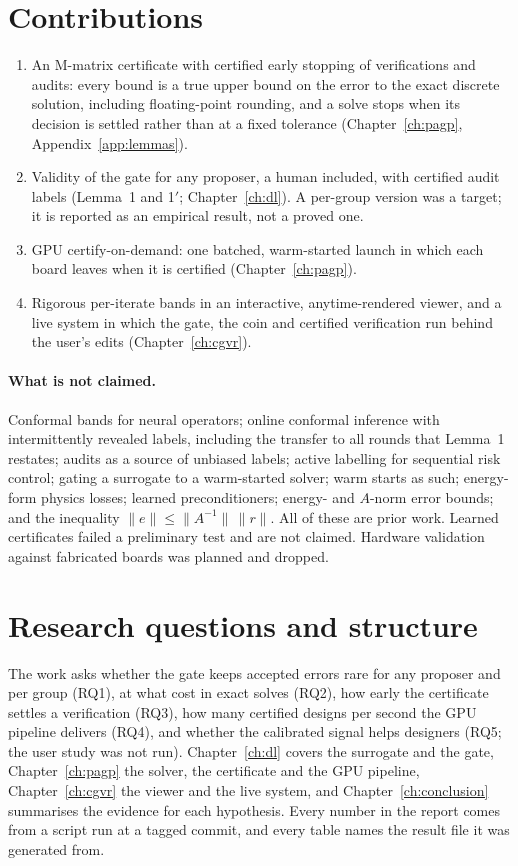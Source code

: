 \section{Contributions}
\begin{enumerate}
\item An M-matrix certificate with certified early stopping of verifications and audits: every
bound is a true upper bound on the error to the exact discrete solution, including floating-point
rounding, and a solve stops when its decision is settled rather than at a fixed tolerance
(Chapter~\ref{ch:pagp}, Appendix~\ref{app:lemmas}).
\item Validity of the gate for any proposer, a human included, with certified audit labels
(Lemma~1 and 1$'$; Chapter~\ref{ch:dl}). A per-group version was a target; it is reported as an
empirical result, not a proved one.
\item GPU certify-on-demand: one batched, warm-started launch in which each board leaves when it is
certified (Chapter~\ref{ch:pagp}).
\item Rigorous per-iterate bands in an interactive, anytime-rendered viewer, and a live system in
which the gate, the coin and certified verification run behind the user's edits
(Chapter~\ref{ch:cgvr}).
\end{enumerate}

\paragraph{What is not claimed.} Conformal bands for neural operators; online conformal inference
with intermittently revealed labels, including the transfer to all rounds that Lemma~1 restates;
audits as a source of unbiased labels; active labelling for sequential risk control; gating a
surrogate to a warm-started solver; warm starts as such; energy-form physics losses; learned
preconditioners; energy- and $A$-norm error bounds; and the inequality
$\|e\|\le\|A^{-1}\|\,\|r\|$. All of these are prior work. Learned certificates failed a
preliminary test and are not claimed. Hardware validation against fabricated boards was planned
and dropped.

\section{Research questions and structure}
The work asks whether the gate keeps accepted errors rare for any proposer and per group (RQ1), at
what cost in exact solves (RQ2), how early the certificate settles a verification (RQ3), how many
certified designs per second the GPU pipeline delivers (RQ4), and whether the calibrated signal
helps designers (RQ5; the user study was not run). Chapter~\ref{ch:dl} covers the surrogate and
the gate, Chapter~\ref{ch:pagp} the solver, the certificate and the GPU pipeline,
Chapter~\ref{ch:cgvr} the viewer and the live system, and Chapter~\ref{ch:conclusion} summarises
the evidence for each hypothesis. Every number in the report comes from a script run at a tagged
commit, and every table names the result file it was generated from.
